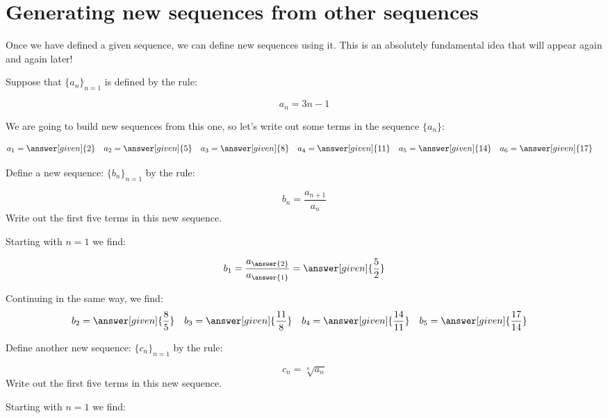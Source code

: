 \documentclass{ximera}
\begin{document}
\section{Generating new sequences from other sequences}

Once we have defined a given sequence, we can define new sequences using it.  This is an absolutely fundamental idea that will appear again and again later!

\begin{example}
Suppose that $\{a_n\}_{n=1}$ is defined by the rule:

\[
a_n = 3n-1
\]

We are going to build new sequences from this one, so let's write out some terms in the sequence $\{a_n\}$:

    \begin{align*}
      a_1 &= \answer[given]{2} & 
      a_2 &= \answer[given]{5} & 
      a_3 &= \answer[given]{8} & 
      a_4 &= \answer[given]{11} & 
      a_5 &= \answer[given]{14}  & 
      a_6 &= \answer[given]{17} 
    \end{align*}

\begin{example}
Define a new sequence: $\{b_n\}_{n=1}$ by the rule:

\[
b_n = \frac{a_{n+1}}{a_n} 
\]
Write out the first five terms in this new sequence.

\begin{explanation}
Starting with $n=1$ we find:

\[      b_1 = \frac{a_{\answer{2}}}{a_{\answer{1}}} = \answer[given]{\frac{5}{2}}       \]
      
Continuing in the same way, we find:     
     \begin{align*}
      	b_2 &=  \answer[given]{\frac{8}{5}}  & 
	b_3 &= \answer[given]{\frac{11}{8}}  & 
	b_4 &= \answer[given]{\frac{14}{11}}  & 
	b_5 &=  \answer[given]{\frac{17}{14}}  & 
    \end{align*}
    
\end{explanation}
    
\end{example}

\begin{example}
Define another new sequence: $\{c_n\}_{n=1}$ by the rule:

\[
c_n = \sqrt[n]{a_n} 
\]
Write out the first five terms in this new sequence.

\begin{explanation}
Starting with $n=1$ we find:


\end{explanation}
\end{example}
\end{example}
\end{document}
